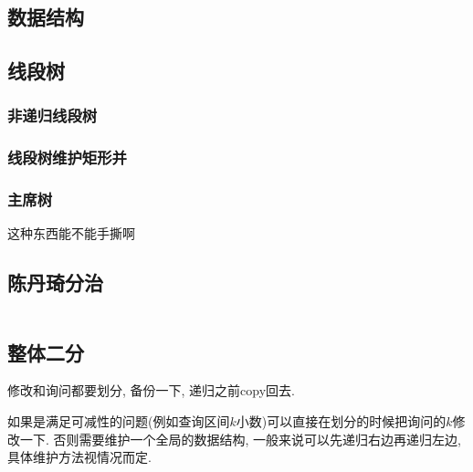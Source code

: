 \documentclass[a4paper]{article}
\begin{document}
\begin{multicols}{2}


			

		\section{数据结构}

			\subsection{线段树}
				\subsubsection{非递归线段树}
					
				
				\subsubsection{线段树维护矩形并}


				\subsubsection{主席树}
					这种东西能不能手撕啊
	
			\subsection{陈丹琦分治}
				\inputminted{cpp}{../src/datastructure/CDQ分治.cpp}
	
			\subsection{整体二分}
				修改和询问都要划分, 备份一下, 递归之前copy回去.

				如果是满足可减性的问题(例如查询区间$k$小数)可以直接在划分的时候把询问的$k$修改一下. 否则需要维护一个全局的数据结构, 一般来说可以先递归右边再递归左边, 具体维护方法视情况而定.

	

\end{multicols}
\end{document}

